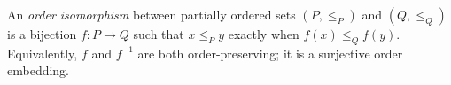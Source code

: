 
An \emph{order isomorphism} between partially ordered sets $(P,\le_P)$ and $(Q,\le_Q)$ is a bijection $f:P\to Q$ such that $x\le_P y$ exactly when $f(x)\le_Q f(y)$. Equivalently, $f$ and $f^{-1}$ are both order-preserving; it is a surjective order embedding.
